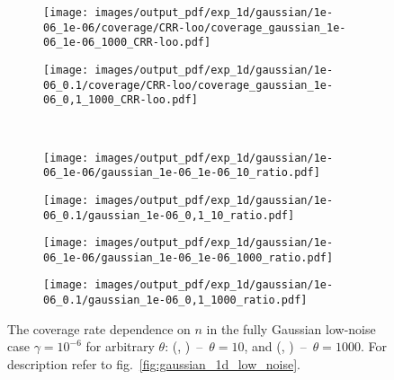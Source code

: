 \documentclass[a4paper,14pt]{extarticle}
\begin{document}
\begin{figure}
\begin{subfigure}[b]{0.25\linewidth}
  \end{subfigure}%
  \begin{subfigure}[b]{0.25\linewidth}
    \texttt{[image: images/output\_pdf/exp\_1d/gaussian/1e-06\_1e-06/coverage/CRR-loo/coverage\_gaussian\_1e-06\_1e-06\_1000\_CRR-loo.pdf]}
  \end{subfigure}%
  \begin{subfigure}[b]{0.25\linewidth}
    \texttt{[image: images/output\_pdf/exp\_1d/gaussian/1e-06\_0.1/coverage/CRR-loo/coverage\_gaussian\_1e-06\_0,1\_1000\_CRR-loo.pdf]}
  \end{subfigure}\\
  \begin{subfigure}[b]{0.25\linewidth}
    \texttt{[image: images/output\_pdf/exp\_1d/gaussian/1e-06\_1e-06/gaussian\_1e-06\_1e-06\_10\_ratio.pdf]}
    \caption{} \label{fig:gaussian_1d_low_noise_arb_c1}
  \end{subfigure}%
  \begin{subfigure}[b]{0.25\linewidth}
    \texttt{[image: images/output\_pdf/exp\_1d/gaussian/1e-06\_0.1/gaussian\_1e-06\_0,1\_10\_ratio.pdf]}
    \caption{} \label{fig:gaussian_1d_low_noise_arb_c2}
  \end{subfigure}%
  \begin{subfigure}[b]{0.25\linewidth}
    \texttt{[image: images/output\_pdf/exp\_1d/gaussian/1e-06\_1e-06/gaussian\_1e-06\_1e-06\_1000\_ratio.pdf]}
    \caption{} \label{fig:gaussian_1d_low_noise_arb_c3}
  \end{subfigure}%
  \begin{subfigure}[b]{0.25\linewidth}
    \texttt{[image: images/output\_pdf/exp\_1d/gaussian/1e-06\_0.1/gaussian\_1e-06\_0,1\_1000\_ratio.pdf]}
    \caption{} \label{fig:gaussian_1d_low_noise_arb_c4}
  \end{subfigure}%
  \caption{The coverage rate dependence on $n$ in the fully Gaussian low-noise case $\gamma=10^{-6}$
  for arbitrary $\theta$:
  (, )~--~$\theta=10$,
  and (, )~--~$\theta=1000$.
  For description refer to fig.~\ref{fig:gaussian_1d_low_noise}.}
  \label{fig:gaussian_1d_low_noise_arb}
\end{figure}
\end{document}
